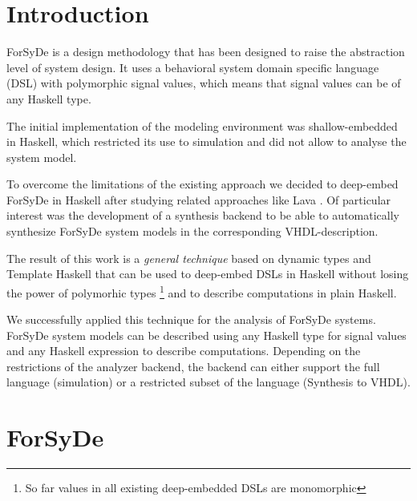 
\section{Introduction}
\label{sec:Introduction}


ForSyDe is a design methodology that has been designed to raise the abstraction level of system design. It uses a behavioral system domain specific language (DSL) with polymorphic signal values, which means that signal values can be of any Haskell type.

The initial implementation of the modeling environment was shallow-embedded in Haskell, which restricted its use to simulation and did not allow to analyse the system model. 

To overcome the limitations of the existing approach we decided to deep-embed ForSyDe in Haskell after studying related approaches like Lava \cite{BjeCla1998}. Of particular interest was the development of a synthesis backend to be able to automatically synthesize ForSyDe system models in the corresponding VHDL-description. 

The result of this work is a \emph{general technique} based on dynamic types and Template Haskell \cite{} that can be used to deep-embed DSLs in Haskell without losing the power of polymorhic types \footnote{So far values in all existing deep-embedded DSLs are monomorphic} and to describe computations in plain Haskell.
 
We successfully applied this technique for the analysis of ForSyDe systems. ForSyDe system models can be described using any Haskell type for signal values and any Haskell expression to describe computations. Depending on the restrictions of the analyzer backend, the backend can either support the full language (simulation) or a restricted subset of the language (Synthesis to VHDL). 

\section{ForSyDe}
\label{sec:ForSyDe}

